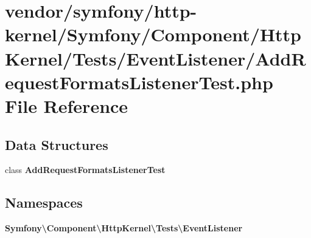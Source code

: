 \section{vendor/symfony/http-\/kernel/\+Symfony/\+Component/\+Http\+Kernel/\+Tests/\+Event\+Listener/\+Add\+Request\+Formats\+Listener\+Test.php File Reference}
\label{_add_request_formats_listener_test_8php}
\subsection*{Data Structures}
\begin{DoxyCompactItemize}
\item 
class {\bf Add\+Request\+Formats\+Listener\+Test}
\end{DoxyCompactItemize}
\subsection*{Namespaces}
\begin{DoxyCompactItemize}
\item 
 {\bf Symfony\textbackslash{}\+Component\textbackslash{}\+Http\+Kernel\textbackslash{}\+Tests\textbackslash{}\+Event\+Listener}
\end{DoxyCompactItemize}
